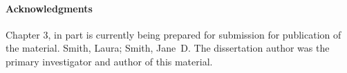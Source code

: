 \paragraph{Acknowledgments}

Chapter 3, in part is currently being prepared for submission for
publication of the material. Smith, Laura; Smith, Jane~D\@. The
dissertation author was the primary investigator and author of this
material.